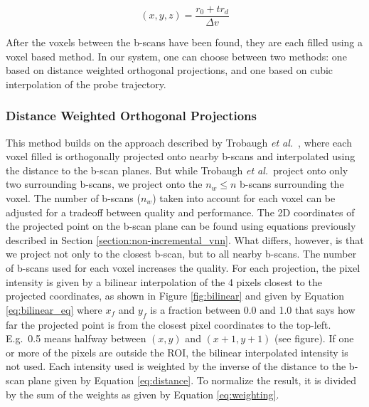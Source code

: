 \begin{equation}
	\label{eq:ray-plane1}
	(x,y,z) = \frac{r_0 + tr_d}{\Delta v}
\end{equation}

After the voxels between the b-scans have been found, they are each filled using a voxel based method. In our system, one can choose between two methods: one based on distance weighted orthogonal projections, and one based on cubic interpolation of the probe trajectory.

\subsubsection{Distance Weighted Orthogonal Projections}

	This method builds on the approach described by Trobaugh \textit{et al.}\ \cite{trobaugh1994}, where each voxel filled is orthogonally projected onto nearby b-scans and interpolated using the distance to the b-scan planes. But while Trobaugh \textit{et al.}\ project onto only two surrounding b-scans, we project onto the $n_w \leq n$ b-scans surrounding the voxel. The number of b-scans ($n_w$) taken into account for each voxel can be adjusted for a tradeoff between quality and performance. The 2D coordinates of the projected point on the b-scan plane can be found using equations previously described in Section \ref{section:non-incremental_vnn}. What differs, however, is that we project not only to the closest b-scan, but to all nearby b-scans. The number of b-scans used for each voxel increases the quality.  For each projection, the pixel intensity is given by a bilinear interpolation of the 4 pixels closest to the projected coordinates, as shown in Figure \ref{fig:bilinear} and given by Equation \ref{eq:bilinear_eq} where $x_f$ and $y_f$ is a fraction between 0.0 and 1.0 that says how far the projected point is from the closest pixel coordinates to the top-left. E.g.\ 0.5 means halfway between $(x,y)$ and $(x+1,y+1)$ (see figure). If one or more of the pixels are outside the ROI, the bilinear interpolated intensity is not used. Each intensity used is weighted by the inverse of the distance to the b-scan plane given by Equation \ref{eq:distance}. To normalize the result, it is divided by the sum of the weights as given by Equation \ref{eq:weighting}.
	
